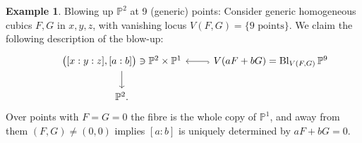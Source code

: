 \documentclass{article}
\theoremstyle{definition}
\newtheorem*{example}{Example}
\DeclareMathOperator{\Bl}{Bl}
\renewcommand{\P}{\mathbb{P}}
\begin{document}
\begin{example}
    Blowing up $\P^2$ at 9 (generic) points: Consider generic homogeneous cubics
    $F,G$ in $x,y,z$, with vanishing locus $V(F,G)=\{\text{9 points}\}$. We
    claim the following description of the blow-up:
    \begin{equation*}
        \begin{tikzcd}
            &\bigl([x:y:z],[a:b]\bigr)\ni\P^2\times\P^1 \ar[d]
            &V(aF+bG)=\Bl_{V(F,G)}\P^9 \ar[l,hook] \\
            &\P^2.
        \end{tikzcd}
    \end{equation*}
    Over points with $F=G=0$ the fibre is the whole copy of $\P^1$, and away
    from them $(F,G)\ne(0,0)$ implies $[a:b]$ is uniquely determined by
    $aF+bG=0$.
\end{example}
\end{document}
